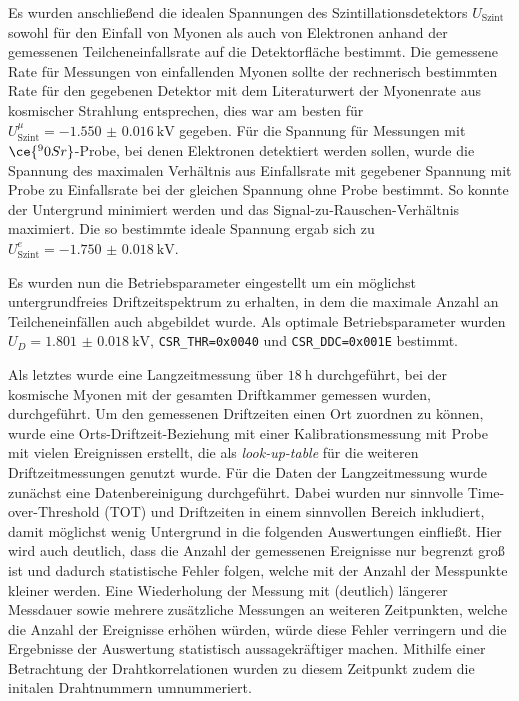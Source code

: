 Es wurden anschließend die idealen Spannungen des Szintillationsdetektors $U_\text{Szint}$ sowohl für den Einfall von Myonen als auch von Elektronen anhand der gemessenen Teilcheneinfallsrate auf die Detektorfläche bestimmt. Die gemessene Rate für Messungen von einfallenden Myonen sollte der rechnerisch bestimmten Rate für den gegebenen Detektor mit dem Literaturwert der Myonenrate aus kosmischer Strahlung entsprechen, dies war am besten für $U_\text{Szint}^\mu=\SI{-1.550(16)}{\kilo\V}$ gegeben. Für die Spannung für Messungen mit $\ce{^90Sr}$-Probe, bei denen Elektronen detektiert werden sollen, wurde die Spannung des maximalen Verhältnis aus Einfallsrate mit gegebener Spannung mit Probe zu Einfallsrate bei der gleichen Spannung ohne Probe bestimmt. So konnte der Untergrund minimiert werden und das Signal-zu-Rauschen-Verhältnis maximiert. Die so bestimmte ideale Spannung ergab sich zu $U_\text{Szint}^e=\SI{-1.750(18)}{\kilo\V}$.

Es wurden nun die Betriebsparameter eingestellt um ein möglichst untergrundfreies Driftzeitspektrum zu erhalten, in dem die maximale Anzahl an Teilcheneinfällen auch abgebildet wurde. Als optimale Betriebsparameter wurden  $U_D=\SI{1.801(18)}{\kilo\V}$, \texttt{CSR\_THR=0x0040} und \texttt{CSR\_DDC=0x001E} bestimmt.

Als letztes wurde eine Langzeitmessung über $\SI{18}{\hour}$ durchgeführt, bei der kosmische Myonen mit der gesamten Driftkammer gemessen wurden, durchgeführt. Um den gemessenen Driftzeiten einen Ort zuordnen zu können, wurde eine Orts-Driftzeit-Beziehung mit einer Kalibrationsmessung mit Probe mit vielen Ereignissen erstellt, die als \textit{look-up-table} für die weiteren Driftzeitmessungen genutzt wurde.
Für die Daten der Langzeitmessung wurde zunächst eine Datenbereinigung durchgeführt. Dabei wurden nur sinnvolle Time-over-Threshold (TOT) und Driftzeiten in einem sinnvollen Bereich inkludiert, damit möglichst wenig Untergrund in die folgenden Auswertungen einfließt. Hier wird auch deutlich, dass die Anzahl der gemessenen Ereignisse nur begrenzt groß ist und dadurch statistische Fehler folgen, welche mit der Anzahl der Messpunkte kleiner werden. Eine Wiederholung der Messung mit (deutlich) längerer Messdauer sowie mehrere zusätzliche Messungen an weiteren Zeitpunkten, welche die Anzahl der Ereignisse erhöhen würden, würde diese Fehler verringern und die Ergebnisse der Auswertung statistisch aussagekräftiger machen.
Mithilfe einer Betrachtung der Drahtkorrelationen wurden zu diesem Zeitpunkt zudem die initalen Drahtnummern umnummeriert.


